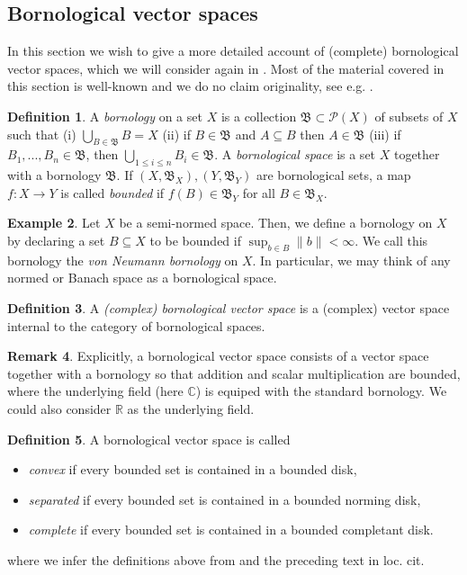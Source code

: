 \documentclass{article}
\numberwithin{equation}{section}
\theoremstyle{definition}
\newtheorem{definition}{Definition}[subsection]
\newtheorem{example}[definition]{Example}
\newtheorem{remark}[definition]{Remark}
\theoremstyle{theorem}
\begin{document}
\subsection{Bornological vector spaces}\label{Subsection: Bornological vector spaces}
In this section we wish to give a more detailed account of (complete) bornological vector spaces, which we will consider again in .
Most of the material covered in this section is well-known and we do no claim originality, see e.g. \cite{Meyer2007Local}.
\begin{definition}\label{Definition: bornology}
    A \emph{bornology} on a set $X$ is a collection $\mathfrak{B} \subset \mathcal{P}(X)$ of subsets of $X$ such that 
    (i) $\bigcup_{B \in \mathfrak{B}} B = X$ (ii) if $B \in \mathfrak{B}$ and $A \subseteq B$ then $A \in \mathfrak{B}$
    (iii) if $B_1,...,B_n \in \mathfrak{B}$, then $\bigcup_{1 \leq i \leq n} B_i \in \mathfrak{B}$. A \emph{bornological space}
    is a set $X$ together with a bornology $\mathfrak{B}$. If $(X,\mathfrak{B}_X),(Y,\mathfrak{B}_Y)$ are bornological sets, a 
    map $f \colon X \to Y$ is called \emph{bounded} if $f(B) \in \mathfrak{B}_Y$ for all $B \in \mathfrak{B}_X$. 
\end{definition}
\begin{example}\label{Example: von Neumann bornology}
    Let $X$ be a semi-normed space. Then, we define a bornology on $X$ by declaring a set $B \subseteq X$ to be bounded if $\sup_{b \in B} \| b \| < \infty$. 
    We call this bornology the \emph{von Neumann bornology} on $X$. In particular, we may think of any normed or Banach space as a bornological space.
\end{example}
\begin{definition}
    A \emph{(complex) bornological vector space} is a (complex) vector space internal to the category of bornological spaces. 
\end{definition}
\begin{remark}
    Explicitly, a bornological vector space consists of a vector space together with a bornology so that addition and scalar multiplication are 
    bounded, where the underlying field (here $\mathbb{C}$) is equiped with the standard bornology. We could also consider $\mathbb{R}$ as the underlying field.
\end{remark}
\begin{definition}
    A bornological vector space is called 
    \begin{itemize}
        \item[(i)] \emph{convex} if every bounded set is contained in a bounded disk,
        \item[(ii)] \emph{separated} if every bounded set is contained in a bounded norming disk,
        \item[(iii)] \emph{complete} if every bounded set is contained in a bounded completant disk.
    \end{itemize}
    where we infer the definitions above from \cite[Definition 2.1.12]{aretz2025functorialitybornological} and the preceding text in loc. cit.
\end{definition}
\end{document}

